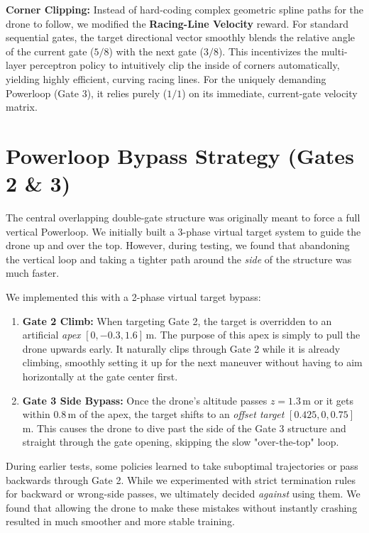 \documentclass[10pt, twocolumn]{article}
\begin{document}
\textbf{Corner Clipping:} Instead of hard-coding complex geometric spline paths for the drone to follow, we modified the \textbf{Racing-Line Velocity} reward. For standard sequential gates, the target directional vector smoothly blends the relative angle of the current gate ($5/8$) with the next gate ($3/8$). This incentivizes the multi-layer perceptron policy to intuitively clip the inside of corners automatically, yielding highly efficient, curving racing lines. For the uniquely demanding Powerloop (Gate 3), it relies purely ($1/1$) on its immediate, current-gate velocity matrix.

\section{Powerloop Bypass Strategy (Gates 2 \& 3)}
The central overlapping double-gate structure was originally meant to force a full vertical Powerloop. We initially built a 3-phase virtual target system to guide the drone up and over the top. However, during testing, we found that abandoning the vertical loop and taking a tighter path around the \emph{side} of the structure was much faster. 

We implemented this with a 2-phase virtual target bypass:
\begin{enumerate}[nosep, leftmargin=1.5em]
    \item \textbf{Gate 2 Climb:} When targeting Gate 2, the target is overridden to an artificial \emph{apex} $[0, {-}0.3, 1.6]$\,m. The purpose of this apex is simply to pull the drone upwards early. It naturally clips through Gate 2 while it is already climbing, smoothly setting it up for the next maneuver without having to aim horizontally at the gate center first.
    \item \textbf{Gate 3 Side Bypass:} Once the drone's altitude passes $z=1.3$\,m or it gets within $0.8$\,m of the apex, the target shifts to an \emph{offset target} $[0.425, 0, 0.75]$\,m. This causes the drone to dive past the side of the Gate 3 structure and straight through the gate opening, skipping the slow "over-the-top" loop.
\end{enumerate}

During earlier tests, some policies learned to take suboptimal trajectories or pass backwards through Gate 2. While we experimented with strict termination rules for backward or wrong-side passes, we ultimately decided \emph{against} using them. We found that allowing the drone to make these mistakes without instantly crashing resulted in much smoother and more stable training. 
\end{document}
